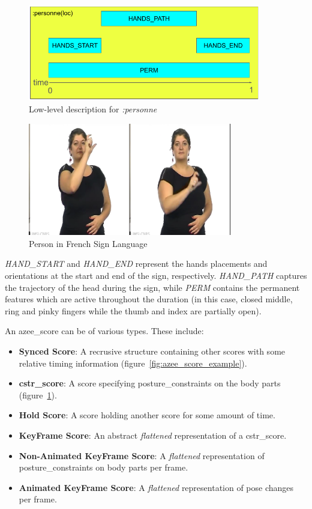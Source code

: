 \documentclass[../../main.tex]{subfiles}
\begin{document}
\begin{figure}
  \centering \includegraphics[width = 4in]{chapters/background_work/images/azee_score_person.png}
  \caption{Low-level description for \emph{:personne}}
  \label{fig:azee_score_person}
\end{figure}

\begin{figure}
  \centering \includegraphics[width = 3.5in]{chapters/background_work/images/person_lsf.png}
  \caption{Person in French Sign Language}
  \label{fig:person_lsf}
\end{figure}

\emph{HAND\_START} and \emph{HAND\_END} represent the hands placements and orientations at the start and end of the sign, respectively. \emph{HAND\_PATH} captures the trajectory of the head during the sign, while \emph{PERM} contains the permanent features which are active throughout the duration (in this case, closed middle, ring and pinky fingers while the thumb and index are partially open).

An \gls{azee_score} can be of various types. These include:

\begin{itemize}
  \item \textbf{Synced Score}: A recrusive structure containing other scores with some relative timing information (figure~\ref{fig:azee_score_example}).
  \item \textbf{\gls{cstr_score}}: A score specifying \gls{posture_constraint}s on the body parts (figure~\ref{fig:azee_score_person}).
  \item \textbf{Hold Score}: A score holding another score for some amount of time.
  \item \textbf{KeyFrame Score}: An abstract \emph{flattened} representation of a \gls{cstr_score}.
  \item \textbf{Non-Animated KeyFrame Score}: A \emph{flattened} representation of \gls{posture_constraint}s on body parts per frame.
  \item \textbf{Animated KeyFrame Score}: A \emph{flattened} representation of pose changes per frame.
\end{itemize}
\end{document}
